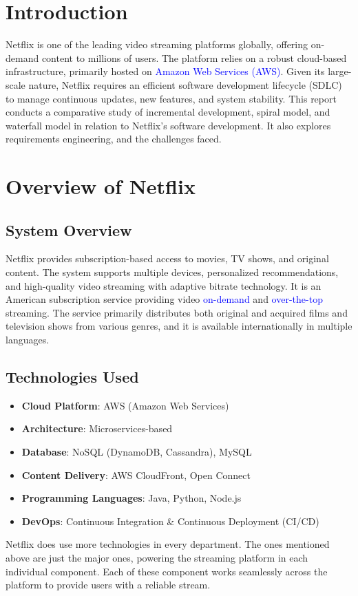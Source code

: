 \documentclass[a4paper,10pt,twoside]{article}
\begin{document}
\tableofcontents
\newpage

\section{Introduction}
Netflix is one of the leading video streaming platforms globally, offering on-demand content to millions of users. The platform relies on a robust cloud-based infrastructure, primarily hosted on \textcolor{Blue}{Amazon Web Services (AWS)}. Given its large-scale nature, Netflix requires an efficient software development lifecycle (SDLC) to manage continuous updates, new features, and system stability.
This report conducts a comparative study of incremental development, spiral model, and waterfall model in relation to Netflix’s software development. It also explores requirements engineering, and the challenges faced.

\section{Overview of Netflix}
\subsection{System Overview}
Netflix provides subscription-based access to movies, TV shows, and original content. The system supports multiple devices, personalized recommendations, and high-quality video streaming with adaptive bitrate technology. It is an American subscription service providing video \textcolor{Blue}{on-demand} and \textcolor{Blue}{over-the-top} streaming. The service primarily distributes both original and acquired films and television shows from various genres, and it is available internationally in multiple languages.

\subsection{Technologies Used}
\begin{itemize}
    \item \textbf{Cloud Platform}: AWS (Amazon Web Services)
    \item \textbf{Architecture}: Microservices-based
    \item \textbf{Database}: NoSQL (DynamoDB, Cassandra), MySQL
    \item \textbf{Content Delivery}: AWS CloudFront, Open Connect
    \item \textbf{Programming Languages}: Java, Python, Node.js
    \item \textbf{DevOps}: Continuous Integration \& Continuous Deployment (CI/CD)
\end{itemize}
Netflix does use more technologies in every department. The ones mentioned above are just the major ones, powering the streaming platform in each individual component. Each of these component works seamlessly across the platform to provide users with a reliable stream. 
\end{document}
